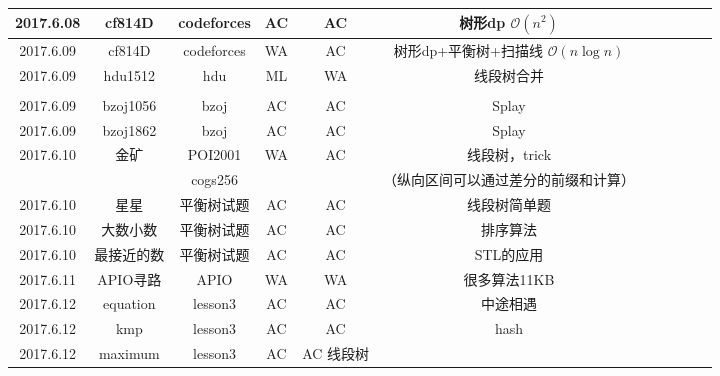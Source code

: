 \documentclass[landscape]{article}
\begin{document}
\begin{longtable}{ccccccccccc}
  \hline
  2017.6.08 & cf814D & codeforces & AC & AC & 树形dp $\mathcal O(n^2)$\\
  \hline
  2017.6.09 & cf814D & codeforces & WA & AC & 树形dp+平衡树+扫描线 $\mathcal O(n\log n)$\\
  \hline
  2017.6.09 & hdu1512 & hdu & ML & WA & 线段树合并\\
  & & & & & \color{red}{（拍了一万组没有出错，不知道怎么回事）}\\
  \hline
  2017.6.09 & bzoj1056 & bzoj & AC & AC & Splay\\
  \hline
  2017.6.09 & bzoj1862 & bzoj & AC & AC & Splay\\
  \hline
  2017.6.10 & 金矿 & POI2001 & WA & AC & 线段树，trick\\
  & & cogs256 & & & （纵向区间可以通过差分的前缀和计算）\\
  \hline
  2017.6.10 & 星星 & 平衡树试题 & AC & AC & 线段树简单题\\
  \hline
  2017.6.10 & 大数小数 & 平衡树试题 & AC & AC & 排序算法\\
  \hline
  2017.6.10 & 最接近的数 & 平衡树试题 & AC & AC & STL的应用\\
  \hline
  2017.6.11 & APIO寻路 & APIO & WA & WA & 很多算法11KB\\
  \hline
  2017.6.12 & equation & lesson3 & AC & AC & 中途相遇\\
  \hline
  2017.6.12 & kmp & lesson3 & AC & AC & hash\\
  \hline
  2017.6.12 & maximum & lesson3 & AC & AC 线段树\\
  \hline
\end{longtable}
\end{document}
